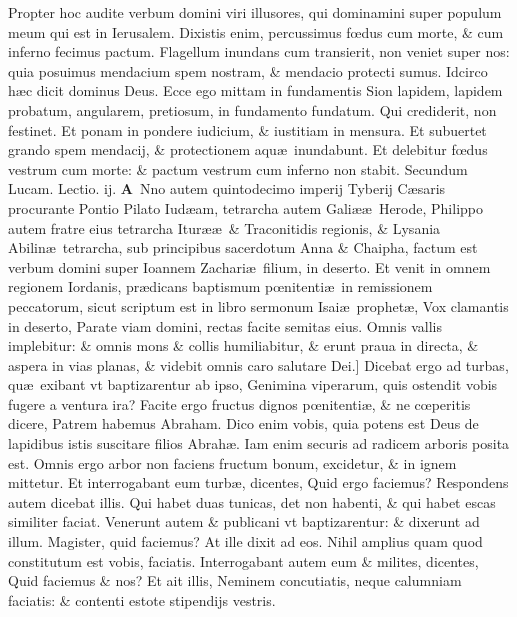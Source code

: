 \documentclass[a5paper,10pt]{book}
\def\ae{æ}
\def\oe{œ}
\begin{document}
\begin{multicols*}{2}
Propter hoc audite verbum domini viri illusores, qui dominamini super populum meum qui est in Ierusalem.
Dixistis enim, percussimus f\oe dus cum morte, \& cum inferno fecimus pactum.
Flagellum inundans cum transierit, non veniet super nos: quia posuimus mendacium spem nostram, \& mendacio protecti sumus.
Idcirco h\ae c dicit dominus Deus. Ecce ego mittam in fundamentis Sion lapidem,
lapidem probatum, angularem, pretiosum, in fundamento fundatum.
Qui crediderit, non festinet. Et ponam in pondere iudicium, \& iustitiam in mensura. Et subuertet grando spem mendacij, \& protectionem aqu\ae \ inundabunt.
Et delebitur f\oe dus vestrum cum morte: \& pactum vestrum cum inferno non stabit.
\newline \color{red} Secundum Lucam. \hfill Lectio. ij. \color{black}
\vspace{-.25em}
\lettrine[lines=2]{\bfseries \color{red} A}{}\textdagger \ Nno autem quintodecimo imperij Tyberij C\ae saris procurante Pontio Pilato Iud\ae am, tetrarcha autem Gali\ae \ae \ Herode, Philippo autem fratre eius tetrarcha Itur\ae \ae \ \& Traconitidis regionis, \& Lysania Abilin\ae \ tetrarcha, sub principibus sacerdotum Anna \& Chaipha, factum est verbum domini super Ioannem Zachari\ae \ filium, in deserto.
Et venit in omnem regionem Iordanis, pr\ae dicans baptismum p\oe nitenti\ae \ in remissionem peccatorum, sicut scriptum est in libro sermonum Isai\ae \ prophet\ae , Vox clamantis in deserto, Parate viam domini, rectas facite semitas eius.
Omnis vallis implebitur: \& omnis mons \& collis humiliabitur, \& erunt praua in directa, \& aspera in vias planas, \& videbit omnis caro salutare Dei.]
Dicebat ergo ad turbas, qu\ae \ exibant vt baptizarentur ab ipso, Genimina viperarum, quis ostendit vobis fugere a ventura ira?
Facite ergo fructus dignos p\oe nitenti\ae , \& ne c\oe peritis dicere, Patrem habemus Abraham.
Dico enim vobis, quia potens est Deus de lapidibus istis suscitare filios Abrah\ae .
Iam enim securis ad radicem arboris posita est.
Omnis ergo arbor non faciens fructum bonum, excidetur, \& in ignem mittetur.
Et interrogabant eum turb\ae , dicentes, Quid ergo faciemus?
Respondens autem dicebat illis. Qui habet duas tunicas, det non habenti, \& qui habet escas similiter faciat.
Venerunt autem \& publicani vt baptizarentur: \& dixerunt ad illum. Magister, quid faciemus? At ille dixit ad eos. Nihil amplius quam quod constitutum est vobis, faciatis.
Interrogabant autem eum \& milites, dicentes, Quid faciemus \& nos? Et ait illis, Neminem concutiatis, neque calumniam faciatis: \& contenti estote stipendijs vestris.

\end{multicols*}
\end{document}
